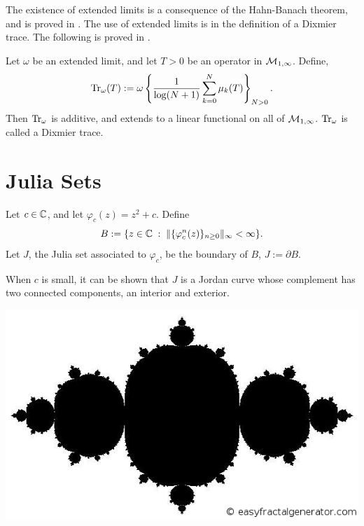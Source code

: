 The existence of extended limits is a consequence of the Hahn-Banach theorem,
and is proved in \cite[Thm 6.2.5]{SingularTraces}. The use
of extended limits is in the definition of a Dixmier trace.
The following is proved in \cite[Ch. 2]{SingularTraces}.
\begin{proposition}
    Let $\omega$ be an extended limit, and let $T > 0$ be an operator
    in $\mathcal{M}_{1,\infty}$. Define,
    \begin{equation}
        \operatorname{Tr}_\omega(T) := \omega\left\{\frac{1}{\log(N+1)}\sum_{k=0}^N \mu_k(T)\right\}_{N > 0}.
    \end{equation}
    Then $\operatorname{Tr}_\omega$ is additive, and extends to a linear functional
    on all of $\mathcal{M}_{1,\infty}$. $\operatorname{Tr}_\omega$ is called a Dixmier trace.
\end{proposition}

\section{Julia Sets}
\begin{definition}
    Let $c \in \mathbb{C}$, and let $\varphi_c(z) = z^2+c$. Define
    \begin{equation}
        B := \{z \in \mathbb{C}\;:\; \|\{\varphi_c^n(z)\}_{n \geq 0}\|_\infty < \infty\}.
    \end{equation}
    Let $J$, the Julia set associated to $\varphi_c$, be the boundary of $B$,
    $J:= \partial B$.
    
    When $c$ is small, it can be shown that $J$ is a Jordan curve
    whose complement has two connected components, an interior and exterior.
\end{definition}
    \includegraphics[width=140mm]{Figures/julia.png}\\

